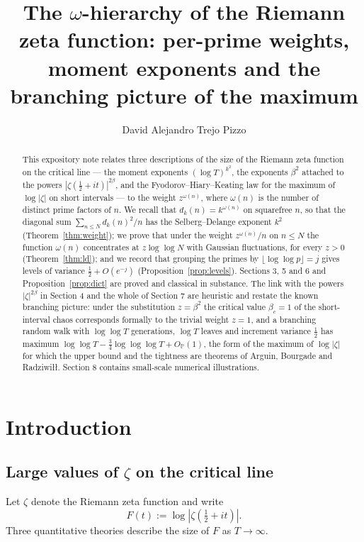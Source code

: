 \documentclass[11pt]{amsart}
\title[The $\omega$-hierarchy of $\zeta$]{The \texorpdfstring{$\omega$}{omega}-hierarchy of the Riemann zeta
function: per-prime weights, moment exponents and the branching picture of the maximum}
\author{David Alejandro Trejo Pizzo}
\theoremstyle{definition}
\newcommand{\Pp}{\mathbb P}
\newcommand{\half}{\tfrac12}
\newcommand{\dk}{d_k}
\newcommand{\loglog}{\log\log}
\newcommand{\llll}{\log\log\log}
\begin{document}
\begin{abstract}
This expository note relates three descriptions of the size of the Riemann zeta function on the critical line
--- the moment exponents $(\log T)^{k^2}$, the exponents $\beta^2$ attached to the powers
$|\zeta(\half+it)|^{2\beta}$, and the Fyodorov--Hiary--Keating law for the maximum of $\log|\zeta|$ on short
intervals --- to the weight $z^{\omega(n)}$, where $\omega(n)$ is the number of distinct prime factors of $n$. We
recall that $\dk(n)=k^{\omega(n)}$ on squarefree $n$, so that the diagonal sum $\sum_{n\le N}\dk(n)^2/n$ has the
Selberg--Delange exponent $k^2$ (Theorem~\ref{thm:weight}); we prove that under the weight $z^{\omega(n)}/n$ on
$n\le N$ the function $\omega(n)$ concentrates at $z\loglog N$ with Gaussian fluctuations, for every $z>0$
(Theorem~\ref{thm:ld}); and we record that grouping the primes by $\lfloor\loglog p\rfloor=j$ gives levels of
variance $\half+O(e^{-j})$ (Proposition~\ref{prop:levels}). Sections 3, 5 and 6 and Proposition~\ref{prop:dict} are proved and classical in
substance. The link with the powers $|\zeta|^{2\beta}$ in Section 4 and the whole of Section 7 are heuristic and
restate the known branching picture: under the substitution
$z=\beta^2$ the critical value $\beta_c=1$ of the short-interval chaos corresponds formally to the trivial weight
$z=1$, and a branching random walk with $\loglog T$ generations, $\log T$ leaves and increment variance $\half$
has maximum $\loglog T-\tfrac34\llll T+O_{\Pp}(1)$, the form of the maximum of $\log|\zeta|$ for which the upper
bound and the tightness are theorems of Arguin, Bourgade and Radziwi{\l}{\l}. Section 8 contains small-scale
numerical illustrations.
\end{abstract}

\maketitle

\tableofcontents

\section{Introduction}\label{sec:intro}
\subsection{Large values of \texorpdfstring{$\zeta$}{zeta} on the critical line}
Let $\zeta$ denote the Riemann zeta function and write
\[
F(t):=\log|\zeta(\half+it)| .
\]
Three quantitative theories describe the size of $F$ as $T\to\infty$.
\end{document}
